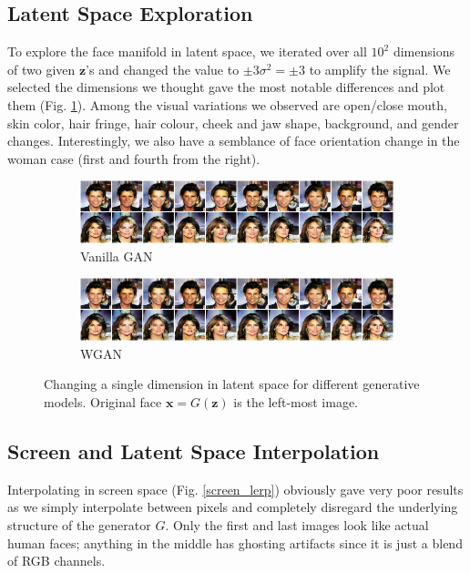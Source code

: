 \documentclass[table]{article}
\def\*#1{\mathbf{#1}}
\begin{document}


\subsection{Latent Space Exploration}
To explore the face manifold in latent space, we iterated over all $10^2$ dimensions of two given $\*z$'s and changed the value to $\pm 3\sigma^2 = \pm 3$ to amplify the signal. We selected the dimensions we thought gave the most notable differences and plot them (Fig. \ref{latent_explore}). Among the visual variations we observed are open/close mouth, skin color, hair fringe, hair colour, cheek and jaw shape, background, and gender changes. Interestingly, we also have a semblance of face orientation change in the woman case (first and fourth from the right).
\begin{figure}[ht]
  \centering
  \begin{subfigure}{\textwidth}
    \centering
    \includegraphics[scale=0.5]{imgs/latent_explore}
    \caption{Vanilla GAN}
  \end{subfigure}

  \vspace*{3mm}
  \begin{subfigure}{\textwidth}
    \centering
    \includegraphics[scale=0.5]{imgs/latent_explore}
    \caption{WGAN}
  \end{subfigure}
  \caption{Changing a single dimension in latent space for different generative models. Original face $\*x = G(\*z)$ is the left-most image.}
  \label{latent_explore}
\end{figure}

\subsection{Screen and Latent Space Interpolation}
Interpolating in screen space (Fig. \ref{screen_lerp}) obviously gave very poor results as we simply interpolate between pixels and completely disregard the underlying structure of the generator $G$. Only the first and last images look like actual human faces; anything in the middle has ghosting artifacts since it is just a blend of RGB channels.
\end{document}
